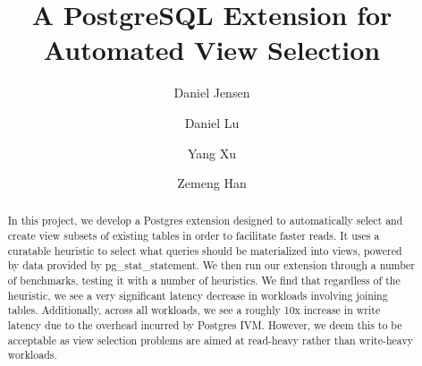 \documentclass[acmtog, natbib=false]{acmart}
\begin{document}
\title{A PostgreSQL Extension for Automated View Selection}


\author{Daniel Jensen}
\author{Daniel Lu}
\author{Yang Xu}
\author{Zemeng Han}


\begin{abstract}
	In this project, we develop a Postgres extension designed to automatically select and create view subsets of existing tables in order to facilitate faster reads. It uses a curatable heuristic to select what queries should be materialized into views, powered by data provided by pg\_stat\_statement. We then run our extension through a number of benchmarks, testing it with a number of heuristics. We find that regardless of the heuristic, we see a very significant latency decrease in workloads involving joining tables. Additionally, across all workloads, we see a roughly 10x increase in write latency due to the overhead incurred by Postgres IVM. However, we deem this to be acceptable as view selection problems are aimed at read-heavy rather than write-heavy workloads.
\end{abstract}

\end{document}

